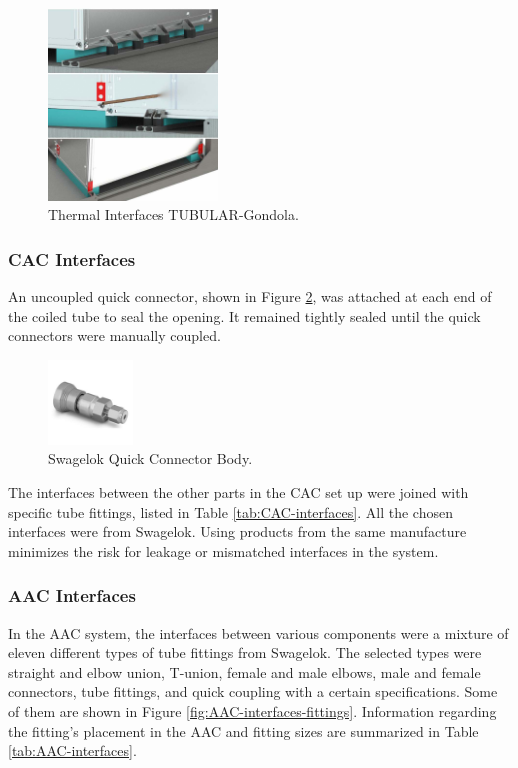 \begin{figure}[H]
    \centering
    \includegraphics[width=0.4\textwidth]{4-experiment-design/img/Mechanical/gondola_fixation.jpg}
    \caption{Thermal Interfaces TUBULAR-Gondola.}
    \label{fig:thermal_interface}
\end{figure}

\subsubsection{CAC Interfaces}
An uncoupled quick connector, shown in Figure \ref{fig:Quick-connector-body}, was attached at each end of the coiled tube to seal the opening. It remained tightly sealed until the quick connectors were manually coupled. 

\begin{figure}[H]
    \centering
    \includegraphics[width=0.2\textwidth]{4-experiment-design/img/Mechanical/CAC-QC-Outlet.jpg}
    \caption{Swagelok Quick Connector Body.}
    \label{fig:Quick-connector-body}
\end{figure}

The interfaces between the other parts in the CAC set up were joined with specific tube fittings, listed in Table \ref{tab:CAC-interfaces}. All the chosen interfaces were from Swagelok. Using products from the same manufacture minimizes the risk for leakage or mismatched interfaces in the system. 



\subsubsection{AAC Interfaces}
In the AAC system, the interfaces between various components were a mixture of eleven different types of tube fittings from Swagelok. The selected types were straight and elbow union, T-union, female and male elbows, male and female connectors, tube fittings, and quick coupling with a certain  specifications. Some of them are shown in Figure \ref{fig:AAC-interfaces-fittings}. Information regarding the fitting's placement in the AAC and fitting sizes are summarized in Table \ref{tab:AAC-interfaces}. 

